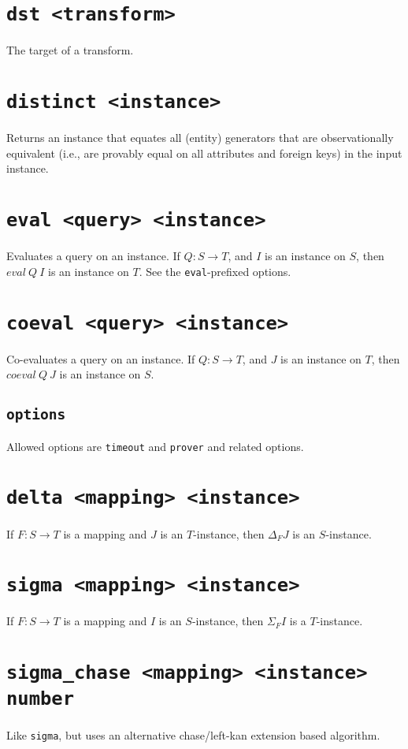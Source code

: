 \documentclass[10pt]{book}
\begin{document}
\section{{\tt dst <transform>}}
The target of a transform.

\section{{\tt distinct <instance>}}
Returns an instance that equates all (entity) generators that are observationally equivalent (i.e., are provably equal on all attributes and foreign keys) in the input instance.  

\section{{\tt eval <query> <instance>}}
Evaluates a query on an instance.  If $Q : S \to T$, and $I$ is an instance on $S$, then $eval \ Q \ I$ is an instance on $T$.
See the {\tt eval}-prefixed options.

\section{{\tt coeval <query> <instance>}}
Co-evaluates a query on an instance.  If $Q : S \to T$, and $J$ is an instance on $T$, then $coeval \ Q \ J$ is an instance on $S$.
\subsection{\tt options}
Allowed options are {\tt timeout} and {\tt prover} and related options.

\section{{\tt delta <mapping> <instance>}}
If $F : S \to T$ is a mapping and $J$ is an $T$-instance, then $\Delta_F J$ is an $S$-instance. 

\section{{\tt sigma <mapping> <instance>}}
If $F : S \to T$ is a mapping and $I$ is an $S$-instance, then $\Sigma_F I$ is a $T$-instance. 

\section{{\tt sigma\_chase <mapping> <instance> number}}
Like {\tt sigma}, but uses an alternative chase/left-kan extension based algorithm.
\end{document}
